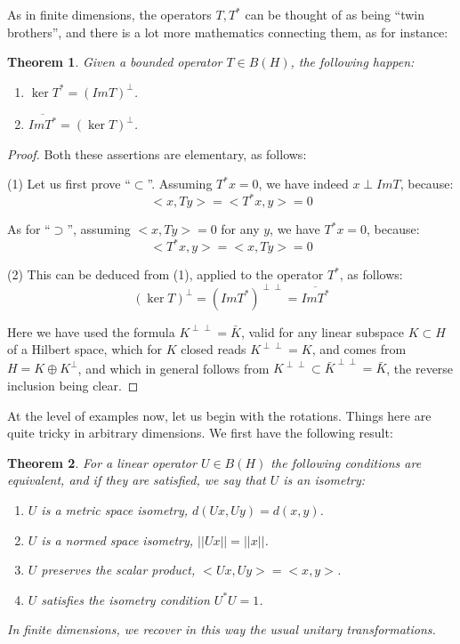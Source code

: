 \documentclass[12pt]{amsbook}
\newtheorem{theorem}{Theorem}[chapter]
\begin{document}
As in finite dimensions, the operators $T,T^*$ can be thought of as being ``twin brothers'', and there is a lot more mathematics connecting them, as for instance:


\begin{theorem}
Given a bounded operator $T\in B(H)$, the following happen:
\begin{enumerate}
\item $\ker T^*=(Im T)^\perp$.

\item $\overline{Im T^*}=(\ker T)^\perp$.
\end{enumerate}
\end{theorem}

\begin{proof}
Both these assertions are elementary, as follows:

\medskip

(1) Let us first prove ``$\subset$''. Assuming $T^*x=0$, we have indeed $x\perp ImT$, because:
$$<x,Ty>
=<T^*x,y>
=0$$

As for ``$\supset$'', assuming $<x,Ty>=0$ for any $y$, we have $T^*x=0$, because:
$$<T^*x,y>
=<x,Ty>
=0$$

(2) This can be deduced from (1), applied to the operator $T^*$, as follows:
$$(\ker T)^\perp
=(Im T^*)^{\perp\perp}
=\overline{Im T^*}$$

Here we have used the formula $K^{\perp\perp}=\bar{K}$, valid for any linear subspace $K\subset H$ of a Hilbert space, which for $K$ closed reads $K^{\perp\perp}=K$, and comes from $H=K\oplus K^\perp$, and which in general follows from $K^{\perp\perp}\subset\bar{K}^{\perp\perp}=\bar{K}$, the reverse inclusion being clear.
\end{proof}

At the level of examples now, let us begin with the rotations. Things here are quite tricky in arbitrary dimensions. We first have the following result:


\begin{theorem}
For a linear operator $U\in B(H)$ the following conditions are equivalent, and if they are satisfied, we say that $U$ is an isometry:
\begin{enumerate}
\item $U$ is a metric space isometry, $d(Ux,Uy)=d(x,y)$.

\item $U$ is a normed space isometry, $||Ux||=||x||$.

\item $U$ preserves the scalar product, $<Ux,Uy>=<x,y>$.

\item $U$ satisfies the isometry condition $U^*U=1$.
\end{enumerate}
In finite dimensions, we recover in this way the usual unitary transformations.
\end{theorem}
\end{document}

